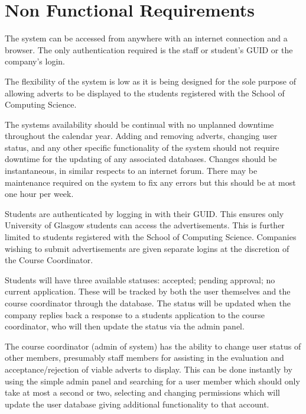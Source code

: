 \documentclass{l3deliverable}
\begin{document}

\section{Non Functional Requirements}

The system can be accessed from anywhere with an internet connection and a
browser. The only authentication required is the staff or student's GUID or the
company's login.

The flexibility of the system is low as it is being designed for the sole
purpose of allowing adverts to be displayed to the students registered with the
School of Computing Science.

The systems availability should be continual with no unplanned downtime
throughout the calendar year. Adding and removing adverts, changing user status,
and any other specific functionality of the system should not require downtime
for the updating of any associated databases. Changes should be instantaneous,
in similar respects to an internet forum. There may be maintenance required on
the system to fix any errors but this should be at most one hour per week.

Students are authenticated by logging in with their GUID. This ensures only
University of Glasgow students can access the advertisements. This is further
limited to students registered with the School of Computing Science. Companies
wishing to submit advertisements are given separate logins at the discretion
of the Course Coordinator.

Students will have three available statuses: accepted; pending approval; no
current application. These will be tracked by both the user themselves and the
course coordinator through the database. The status will be updated when the
company replies back a response to a students application to the course
coordinator, who will then update the status via the admin panel.

The course coordinator (admin of system) has the ability to change user status
of other members, presumably staff members for assisting in the evaluation and
acceptance/rejection of viable adverts to display. This can be done instantly by
using the simple admin panel and searching for a user member which should only
take at most a second or two, selecting and changing permissions which will
update the user database giving additional functionality to that account.
\end{document}

